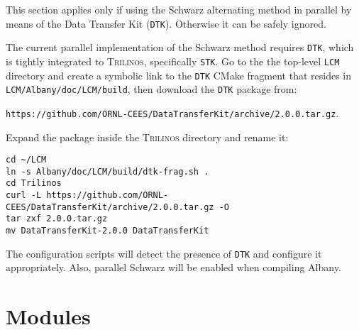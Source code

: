 \documentclass{article}
\newcommand{\trilinos}{\textsc{Trilinos}}
\begin{document}
This section applies only if using the Schwarz alternating method in parallel by
means of the Data Transfer Kit (\verb+DTK+).  Otherwise it can be safely
ignored.

The current parallel implementation of the Schwarz method requires \verb+DTK+,
which is tightly integrated to \trilinos{}, specifically \verb+STK+. Go to the
the top-level \verb+LCM+ directory and create a symbolic link to the \verb+DTK+
CMake fragment that resides in \verb+LCM/Albany/doc/LCM/build+, then download
the \verb+DTK+ package from:

\verb+https://github.com/ORNL-CEES/DataTransferKit/archive/2.0.0.tar.gz+.

Expand the package inside the \trilinos{} directory and rename it:
\begin{verbatim}
cd ~/LCM
ln -s Albany/doc/LCM/build/dtk-frag.sh .
cd Trilinos
curl -L https://github.com/ORNL-CEES/DataTransferKit/archive/2.0.0.tar.gz -O
tar zxf 2.0.0.tar.gz
mv DataTransferKit-2.0.0 DataTransferKit
\end{verbatim}
The configuration scripts will detect the presence of \verb+DTK+ and
configure it appropriately. Also, parallel Schwarz will be enabled when
compiling Albany.

\section{Modules}
\label{sec:modules}
\end{document}
